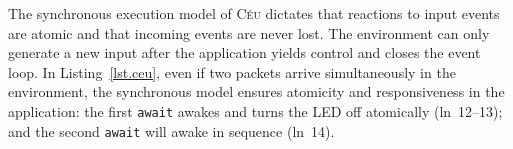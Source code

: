 \documentclass[sigplan,10pt,review,anonymous]{acmart}\settopmatter{printfolios=true,printccs=false,printacmref=false}
\newcommand{\CEU}{\textsc{C\'{e}u}\xspace}
\newcommand{\code}[1] {{\small{\texttt{#1}}}}
\begin{document}
The synchronous execution model of \CEU dictates that reactions to input events
are atomic and that incoming events are never lost.
%
The
environment can only generate a new input after the application yields control
and closes the event loop.
%
In Listing~\ref{lst.ceu}, even if two packets arrive simultaneously in the
environment, the synchronous model ensures atomicity and responsiveness in the
application:
    the first \code{await} awakes and turns the LED off atomically
    (ln~12--13);
    and the second \code{await} will awake in sequence (ln~14).
%
\end{document}
